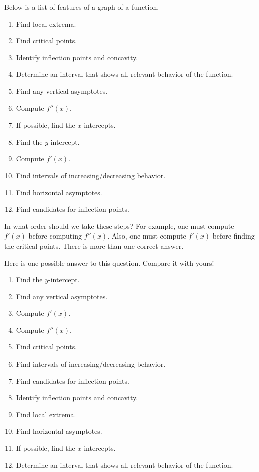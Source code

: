 \documentclass{ximera}
\begin{document}
\begin{problem}%
  Below is a list of features of a graph of a function.
  \begin{enumerate}
  \item Find local extrema.
  \item Find critical points.
  \item Identify inflection points and concavity.
  \item Determine an interval that shows all relevant behavior of the function. 
  \item Find any vertical asymptotes.
  \item Compute $f''(x)$.
  \item If possible, find the $x$-intercepts.
  \item Find the $y$-intercept.
  \item Compute $f'(x)$.
  \item Find intervals of increasing/decreasing behavior.
  \item Find horizontal asymptotes.
  \item Find candidates for inflection points.
 \end{enumerate}
  In what order should we take these steps? For example, one must compute
   $f'(x)$ before computing $f''(x)$. Also, one must compute $f'(x)$ before 
   finding the critical points. There is more than one correct answer.
  \begin{freeResponse}
  Here is one possible answer to this question.  Compare it with yours!
    \begin{enumerate}
  \item Find the $y$-intercept.
  \item Find any vertical asymptotes.
  \item Compute $f'(x)$.
  \item Compute $f''(x)$.
  \item Find critical points.
  \item Find intervals of increasing/decreasing behavior.
  \item Find candidates for inflection points.
  \item Identify inflection points and concavity.
  \item Find local extrema.
  \item Find horizontal asymptotes.
  \item If possible, find the $x$-intercepts.
  \item Determine an interval that shows all relevant behavior of the function. 
  \end{enumerate}
  \end{freeResponse}
\end{problem}



\end{document}
